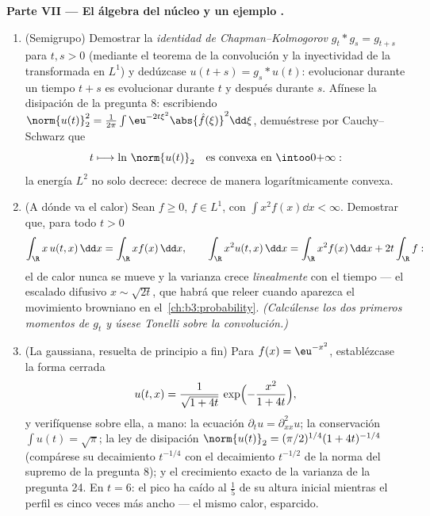 \begin{problem}[{Problema de fin de semana --- $\partial_tu =
\partial^2_{xx}u$, resuelta de principio a fin}]
\medskip
\noindent\textbf{Parte VII --- El álgebra del núcleo y un ejemplo
.}
\begin{enumerate}[resume]
  \item (Semigrupo) Demostrar la \emph{identidad de Chapman--Kolmogorov}
  $g_t * g_s = g_{t+s}$ para $t, s > 0$ (mediante el teorema de la
  convolución y la inyectividad de la transformada en $L^1$) y dedúzcase
  $u(t + s) = g_s *
        u(t)$: evolucionar durante un tiempo $t + s$ es evolucionar
  durante $t$ y después durante $s$. Afínese la disipación de la
  pregunta 8: escribiendo $\norm{u(t)}_2^2 = \frac1{2\pi}\int
        \eu^{-2t\xi^2}\abs{\hat f(\xi)}^2\dd\xi$, demuéstrese por
  Cauchy--Schwarz que
        \[
        t \longmapsto \ln\,\norm{u(t)}_2
        \quad\text{es convexa en } \intoo0{+\infty} :
        \]
        la energía $L^2$ no solo decrece: decrece de manera
        logarítmicamente convexa. \item (A dónde va el calor) Sean
        $f \geq 0$, $f \in L^1$, con $\int x^2f(x)\dd x < \infty$.
        Demostrar que, para todo
        $t > 0$
        \[
        \int_\R x\,u(t, x)\,\dd x = \int_\R x f(x)\,\dd x,
        \qquad
        \int_\R x^2u(t, x)\,\dd x
        = \int_\R x^2f(x)\,\dd x + 2t\int_\R f :
        \]
        el  de calor nunca se mueve
        y la varianza crece \emph{linealmente} con el tiempo --- el
        escalado difusivo $x \sim \sqrt{2t}$, que habrá que releer
        cuando aparezca el movimiento browniano en
        el~\cref{ch:b3:probability}. \emph{(Calcúlense los dos primeros
        momentos de $g_t$ y úsese Tonelli sobre la convolución.)} \item
        (La gaussiana, resuelta de principio a fin) Para $f(x) =
        \eu^{-x^2}$, establézcase la forma cerrada
        \[
        u(t, x) = \frac1{\sqrt{1 + 4t}}\,
        \exp\Bigl(-\frac{x^2}{1 + 4t}\Bigr),
        \]
        y verifíquense sobre ella, a mano: la ecuación $\partial_tu
        = \partial^2_{xx}u$; la conservación $\int u(t) =
        \sqrt\pi$; la ley de disipación $\norm{u(t)}_2 =
        (\pi/2)^{1/4}(1 + 4t)^{-1/4}$ (compárese su decaimiento
        $t^{-1/4}$ con el decaimiento $t^{-1/2}$ de la norma del supremo
        de la pregunta 8); y el crecimiento exacto de la varianza de la
        pregunta 24. En $t = 6$: el pico ha caído al $\frac15$ de su
        altura inicial mientras el perfil es cinco veces más ancho ---
        el mismo calor, esparcido.
\end{enumerate}
\end{problem}
